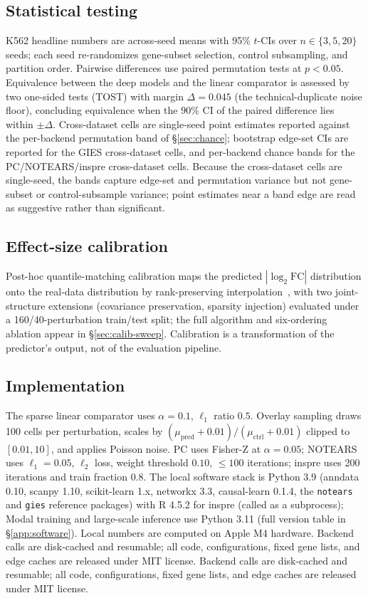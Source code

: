 \documentclass{article}
\theoremstyle{plain}
\theoremstyle{definition}
\theoremstyle{remark}
\begin{document}
\subsection{Statistical testing}
K562 headline numbers are across-seed means with 95\% $t$-CIs over $n\in\{3,5,20\}$ seeds; each seed re-randomizes gene-subset selection, control subsampling, and partition order. Pairwise differences use paired permutation tests at $p<0.05$. Equivalence between the deep models and the linear comparator is assessed by two one-sided tests (TOST) with margin $\Delta = 0.045$ (the technical-duplicate noise floor), concluding equivalence when the $90\%$ CI of the paired difference lies within $\pm\Delta$. Cross-dataset cells are single-seed point estimates reported against the per-backend permutation band of \S\ref{sec:chance}; bootstrap edge-set CIs are reported for the GIES cross-dataset cells, and per-backend chance bands for the PC/NOTEARS/inspre cross-dataset cells. Because the cross-dataset cells are single-seed, the bands capture edge-set and permutation variance but not gene-subset or control-subsample variance; point estimates near a band edge are read as suggestive rather than significant.

\subsection{Effect-size calibration}
Post-hoc quantile-matching calibration maps the predicted $|\log_2\mathrm{FC}|$ distribution onto the real-data distribution by rank-preserving interpolation~\citep{bolstad2003,reinhard2001}, with two joint-structure extensions (covariance preservation, sparsity injection) evaluated under a 160/40-perturbation train/test split; the full algorithm and six-ordering ablation appear in \S\ref{sec:calib-sweep}. Calibration is a transformation of the predictor's output, not of the evaluation pipeline.

\subsection{Implementation}
\label{sec:impl}
The sparse linear comparator uses $\alpha=0.1$, $\ell_1$ ratio $0.5$. Overlay sampling draws 100 cells per perturbation, scales by $(\mu_{\text{pred}}+0.01)/(\mu_{\text{ctrl}}+0.01)$ clipped to $[0.01,10]$, and applies Poisson noise. PC uses Fisher-Z at $\alpha=0.05$; NOTEARS uses $\ell_1=0.05$, $\ell_2$ loss, weight threshold $0.10$, $\leq 100$ iterations; inspre uses 200 iterations and train fraction $0.8$. The local software stack is Python 3.9 (anndata 0.10, scanpy 1.10, scikit-learn 1.x, networkx 3.3, causal-learn 0.1.4, the \texttt{notears} and \texttt{gies} reference packages) with R 4.5.2 for inspre (called as a subprocess); Modal training and large-scale inference use Python 3.11 (full version table in \S\ref{app:software}). Local numbers are computed on Apple M4 hardware. Backend calls are disk-cached and resumable; all code, configurations, fixed gene lists, and edge caches are released under MIT license. Backend calls are disk-cached and resumable; all code, configurations, fixed gene lists, and edge caches are released under MIT license.
\end{document}
